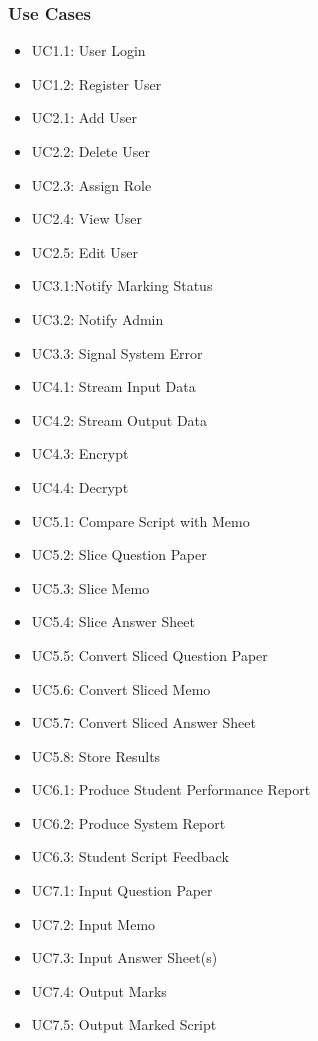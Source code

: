\documentclass{article}
\begin{document}
	\subsubsection{Use Cases}
	\begin{itemize}
	\item UC1.1: User Login
	\item UC1.2: Register User
	\item UC2.1: Add User
	\item UC2.2: Delete User
	\item UC2.3: Assign Role
	\item UC2.4: View User
	\item UC2.5: Edit User
	\item UC3.1:Notify Marking Status
	\item UC3.2: Notify Admin
	\item UC3.3: Signal System Error
	\item UC4.1: Stream Input Data
	\item UC4.2: Stream Output Data
	\item UC4.3: Encrypt
	\item UC4.4: Decrypt
	\item UC5.1: Compare Script with Memo
	\item UC5.2: Slice Question Paper
	\item UC5.3: Slice Memo
	\item UC5.4: Slice Answer Sheet
	\item UC5.5: Convert Sliced Question Paper
	\item UC5.6: Convert Sliced Memo
	\item UC5.7: Convert Sliced Answer Sheet
	\item UC5.8: Store Results
	\item UC6.1: Produce Student Performance Report
	\item UC6.2: Produce System Report
	\item UC6.3: Student Script Feedback
	\item UC7.1: Input Question Paper
	\item UC7.2: Input Memo
	\item UC7.3: Input Answer Sheet(s)
	\item UC7.4: Output Marks
	\item UC7.5: Output Marked Script
	\end{itemize}
\end{document}
